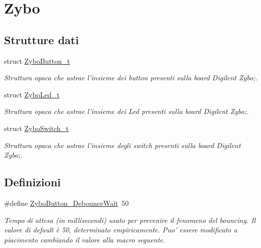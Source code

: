 \hypertarget{group___zybo}{\section{Zybo}
\label{group___zybo}
}
\subsection*{Strutture dati}
\begin{DoxyCompactItemize}
\item 
struct \hyperlink{struct_zybo_button__t}{Zybo\+Button\+\_\+t}
\begin{DoxyCompactList}\small\item\em Struttura opaca che astrae l'insieme dei button presenti sulla board Digilent Zybo;. \end{DoxyCompactList}\item 
struct \hyperlink{struct_zybo_led__t}{Zybo\+Led\+\_\+t}
\begin{DoxyCompactList}\small\item\em Struttura opaca che astrae l'insieme dei Led presenti sulla board Digilent Zybo;. \end{DoxyCompactList}\item 
struct \hyperlink{struct_zybo_switch__t}{Zybo\+Switch\+\_\+t}
\begin{DoxyCompactList}\small\item\em Struttura opaca che astrae l'insieme degli switch presenti sulla board Digilent Zybo;. \end{DoxyCompactList}\end{DoxyCompactItemize}
\subsection*{Definizioni}
\begin{DoxyCompactItemize}
\item 
\#define \hyperlink{group___zybo_ga8960eefa6a431f50d4fe2a2f8063da3f}{Zybo\+Button\+\_\+\+Debounce\+Wait}~50
\begin{DoxyCompactList}\small\item\em Tempo di attesa (in millisecondi) usato per prevenire il fenomeno del bouncing. Il valore di default è 50, determinato empiricamente. Puo' essere modificato a piacimento cambiando il valore alla macro seguente. \end{DoxyCompactList}\end{DoxyCompactItemize}
